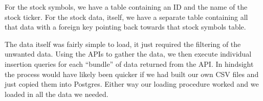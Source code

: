 \documentclass{article}
\begin{document}
    For the stock symbols, we have a table containing an ID and the name of the stock ticker. For
    the stock data, itself, we have a separate table containing all that data with a foreign key
    pointing back towards that stock symbols table.

    The data itself was fairly simple to load, it just required the filtering of the unwanted
    data. Using the APIs to gather the data, we then execute individual insertion queries for
    each ``bundle'' of data returned from the API. In hindsight the process would have likely
    been quicker if we had built our own CSV files and just copied them into Postgres. Either way
    our loading procedure worked and we loaded in all the data we needed.
\end{document}
